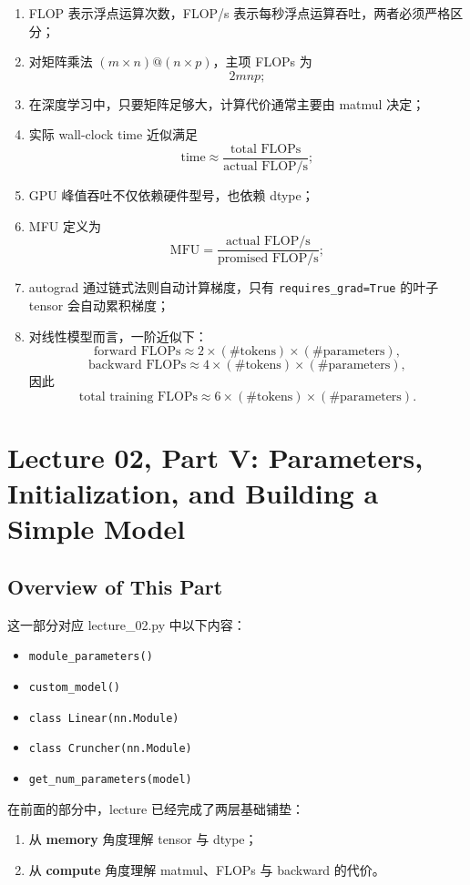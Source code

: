 \documentclass[a4paper,UTF8]{article}
\numberwithin{equation}{section}
\begin{document}
\begin{enumerate}
    \item FLOP 表示浮点运算次数，FLOP/s 表示每秒浮点运算吞吐，两者必须严格区分；
    \item 对矩阵乘法 \((m \times n) @ (n \times p)\)，主项 FLOPs 为
    \[
    2mnp;
    \]
    \item 在深度学习中，只要矩阵足够大，计算代价通常主要由 matmul 决定；
    \item 实际 wall-clock time 近似满足
    \[
    \text{time} \approx \frac{\text{total FLOPs}}{\text{actual FLOP/s}};
    \]
    \item GPU 峰值吞吐不仅依赖硬件型号，也依赖 dtype；
    \item MFU 定义为
    \[
    \mathrm{MFU} = \frac{\text{actual FLOP/s}}{\text{promised FLOP/s}};
    \]
    \item autograd 通过链式法则自动计算梯度，只有 \verb|requires_grad=True| 的叶子 tensor 会自动累积梯度；
    \item 对线性模型而言，一阶近似下：
    \[
    \text{forward FLOPs} \approx 2 \times (\#\text{tokens}) \times (\#\text{parameters}),
    \]
    \[
    \text{backward FLOPs} \approx 4 \times (\#\text{tokens}) \times (\#\text{parameters}),
    \]
    因此
    \[
    \text{total training FLOPs} \approx 6 \times (\#\text{tokens}) \times (\#\text{parameters}).
    \]
\end{enumerate}


\section{Lecture 02, Part V: Parameters, Initialization, and Building a Simple Model}

\subsection{Overview of This Part}

这一部分对应 lecture\_02.py 中以下内容：
\begin{itemize}
    \item \verb|module_parameters()|
    \item \verb|custom_model()|
    \item \verb|class Linear(nn.Module)|
    \item \verb|class Cruncher(nn.Module)|
    \item \verb|get_num_parameters(model)|
\end{itemize}

在前面的部分中，lecture 已经完成了两层基础铺垫：
\begin{enumerate}
    \item 从 \textbf{memory} 角度理解 tensor 与 dtype；
    \item 从 \textbf{compute} 角度理解 matmul、FLOPs 与 backward 的代价。
\end{enumerate}
\end{document}
